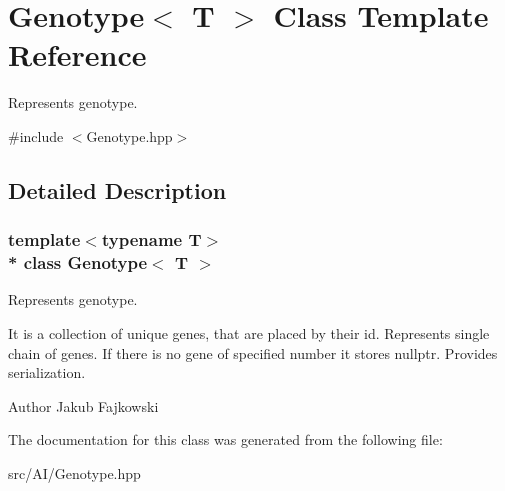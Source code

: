 \hypertarget{classGenotype}{}\section{Genotype$<$ T $>$ Class Template Reference}
\label{classGenotype}


Represents genotype.  




{\ttfamily \#include $<$Genotype.\+hpp$>$}



\subsection{Detailed Description}
\subsubsection*{template$<$typename T$>$\\*
class Genotype$<$ T $>$}

Represents genotype. 

It is a collection of unique genes, that are placed by their id. Represents single chain of genes. If there is no gene of specified number it stores nullptr. Provides serialization. \begin{DoxyAuthor}{Author}
Jakub Fajkowski 
\end{DoxyAuthor}


The documentation for this class was generated from the following file\+:\begin{DoxyCompactItemize}
\item 
src/\+A\+I/Genotype.\+hpp\end{DoxyCompactItemize}
